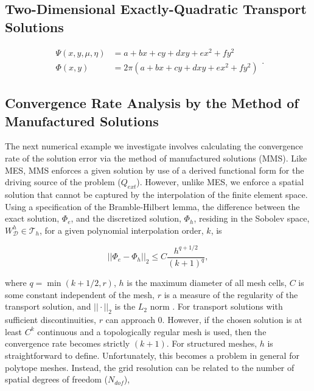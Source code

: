 \subsection{Two-Dimensional Exactly-Quadratic Transport Solutions}
\label{sec::BF_Results_Quadratic}

\begin{equation}
\label{eq::BF_Results_Quadratic_fluxsols}
\begin{aligned}
\Psi (x,y,\mu,\eta) &= a + bx + c y+ d xy + e x^2 + fy^2 \\
\Phi (x,y) &= 2 \pi \left(  a + bx + c y+ d xy + e x^2 + fy^2 \right)
\end{aligned} .
\end{equation}

\subsection{Convergence Rate Analysis by the Method of Manufactured Solutions}
\label{sec::BF_Results_MMS}

The next numerical example we investigate involves calculating the convergence rate of the solution error via the method of manufactured solutions (MMS). Like MES, MMS enforces a given solution by use of a derived functional form for the driving source of the problem ($Q_{ext}$). However, unlike MES, we enforce a spatial solution that cannot be captured by the interpolation of the finite element space. Using a specification of the Bramble-Hilbert \cite{bramble1970estimation} lemma, the difference between the exact solution, $\Phi_e$, and the discretized solution, $\Phi_h$, residing in the Sobolev space, $W_{\mathcal{D}}^h \in \mathcal{T}_h$, for a given polynomial interpolation order, $k$, is

\begin{equation}
\label{eq::BF_Results_MMS_errnorm}
|| \Phi_{e} - \Phi_h || _{2}  \leq C \frac{h^{q+1/2}}{(k+1)^q} ,
\end{equation}

\noindent where $q=\min(k+1/2,r )$, $h$ is the maximum diameter of all mesh cells, $C$ is some constant independent of the mesh, $r$ is a measure of the regularity of the transport solution, and $|| \cdot ||_2$ is the $L_2$ norm \cite{houston2000stabilized}. For transport solutions with sufficient discontinuities, $r$ can approach 0. However, if the chosen solution is at least $C^k$ continuous and a topologically regular mesh is used, then the convergence rate becomes strictly $(k+1)$. For structured meshes, $h$ is straightforward to define. Unfortunately, this becomes a problem in general for polytope meshes. Instead, the grid resolution can be related to the number of spatial degrees of freedom ($N_{dof}$),

